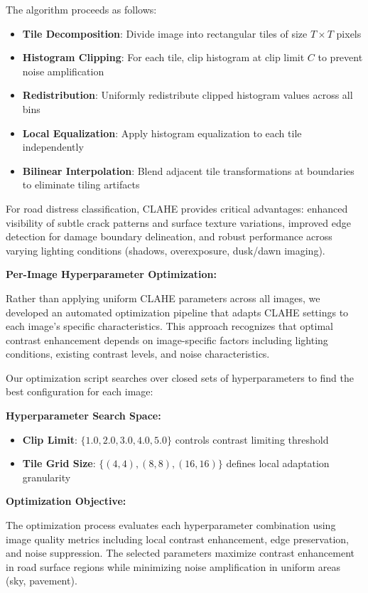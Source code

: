 \documentclass[12pt]{article}
\begin{document}
The algorithm proceeds as follows:
\begin{itemize}[itemsep=1pt,parsep=0pt,topsep=2pt]
\item \textbf{Tile Decomposition}: Divide image into rectangular tiles of size $T \times T$ pixels
\item \textbf{Histogram Clipping}: For each tile, clip histogram at clip limit $C$ to prevent noise amplification
\item \textbf{Redistribution}: Uniformly redistribute clipped histogram values across all bins
\item \textbf{Local Equalization}: Apply histogram equalization to each tile independently
\item \textbf{Bilinear Interpolation}: Blend adjacent tile transformations at boundaries to eliminate tiling artifacts
\end{itemize}

For road distress classification, CLAHE provides critical advantages: enhanced visibility of subtle crack patterns and surface texture variations, improved edge detection for damage boundary delineation, and robust performance across varying lighting conditions (shadows, overexposure, dusk/dawn imaging).

\textbf{Per-Image Hyperparameter Optimization:}

Rather than applying uniform CLAHE parameters across all images, we developed an automated optimization pipeline that adapts CLAHE settings to each image's specific characteristics. This approach recognizes that optimal contrast enhancement depends on image-specific factors including lighting conditions, existing contrast levels, and noise characteristics.

Our optimization script searches over closed sets of hyperparameters to find the best configuration for each image:

\textbf{Hyperparameter Search Space:}
\begin{itemize}[itemsep=1pt,parsep=0pt,topsep=2pt]
\item \textbf{Clip Limit}: $\{1.0, 2.0, 3.0, 4.0, 5.0\}$  controls contrast limiting threshold
\item \textbf{Tile Grid Size}: $\{(4,4), (8,8), (16,16)\}$  defines local adaptation granularity
\end{itemize}

\textbf{Optimization Objective:}

The optimization process evaluates each hyperparameter combination using image quality metrics including local contrast enhancement, edge preservation, and noise suppression. The selected parameters maximize contrast enhancement in road surface regions while minimizing noise amplification in uniform areas (sky, pavement).
\end{document}
